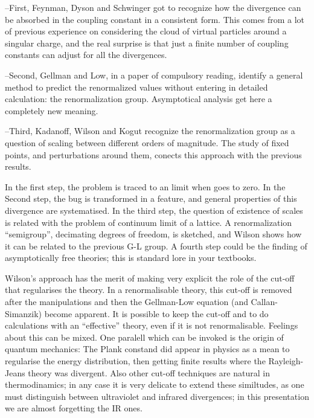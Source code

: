 \documentclass[a4paper,a4paper]{article}
\begin{document}
--First, Feynman, Dyson and Schwinger got to recognize how the divergence can be 
absorbed in the coupling constant in a consistent form. This comes from a lot of
previous experience on considering the cloud of virtual particles around a 
singular charge, and the real surprise is that just a finite number of coupling
constants can adjust for all the divergences.

--Second, Gellman and Low\cite{gl}, in a paper of compulsory reading, identify a general 
method to predict the renormalized values without entering in detailed calculation: the 
renormalization group. Asymptotical analysis get here a completely new meaning.

--Third, Kadanoff, Wilson and Kogut recognize the renormalization group as a question of 
scaling between different orders of magnitude. The study of fixed points, and perturbations
around them, conects this approach  with the previous results. 

In the first step, the problem is traced to an limit when \coordHE{} goes to zero. In the Second 
step, the bug is transformed in a feature, and general properties of this \coordHE{} divergence are 
systematised. In the third step, the question of existence of scales is related with the 
problem of continuum limit of a lattice. A renormalization ``semigroup'', decimating degrees 
of freedom, is sketched, and Wilson shows how it can be related to the previous G-L group. 
A fourth step could be the finding of asymptotically free theories; this is standard lore in 
your textbooks. 

Wilson's approach has the merit of making very explicit the role of the cut-off that
regularises the theory. In a renormalisable theory, this cut-off is removed after
the  manipulations and then the Gellman-Low equation (and Callan-Simanzik) become apparent.
It is possible to keep the cut-off and to do calculations with an ``effective'' theory,
even if it is not renormalisable. Feelings about this can be mixed. One paralell which
can be invoked is the origin of quantum mechanics: The Plank constand did appear in
physics as a mean to regularise the energy distribution, then getting finite results
where the Rayleigh-Jeans theory was divergent. Also other cut-off techniques are
natural in thermodinamics; in any case it is very delicate to extend these similtudes,
as one must distinguish between ultraviolet and infrared divergences; in this presentation
we are almost forgetting the IR ones.
 
\end{document}
